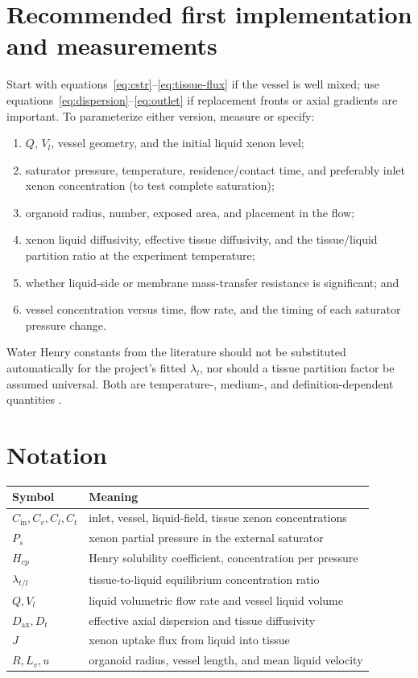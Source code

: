\documentclass[11pt]{article}
\begin{document}
\section{Recommended first implementation and measurements}

Start with equations~\eqref{eq:cstr}--\eqref{eq:tissue-flux} if the vessel is
well mixed; use equations~\eqref{eq:dispersion}--\eqref{eq:outlet} if
replacement fronts or axial gradients are important. To parameterize either
version, measure or specify:
\begin{enumerate}
  \item \(Q\), \(V_l\), vessel geometry, and the initial liquid xenon level;
  \item saturator pressure, temperature, residence/contact time, and
        preferably inlet xenon concentration (to test complete saturation);
  \item organoid radius, number, exposed area, and placement in the flow;
  \item xenon liquid diffusivity, effective tissue diffusivity, and the
        tissue/liquid partition ratio at the experiment temperature;
  \item whether liquid-side or membrane mass-transfer resistance is
        significant; and
  \item vessel concentration versus time, flow rate, and the timing of each
        saturator pressure change.
\end{enumerate}
Water Henry constants from the literature should not be substituted
automatically for the project's fitted \(\lambda_l\), nor should a tissue
partition factor be assumed universal. Both are temperature-, medium-, and
definition-dependent quantities \cite{Sander2023,Ercan1979}.

\section*{Notation}
\begin{center}
\begin{tabular}{@{}ll@{}}
\toprule
Symbol & Meaning\\
\midrule
\(C_{\mathrm{in}},C_v,C_l,C_t\) & inlet, vessel, liquid-field, tissue xenon concentrations\\
\(P_s\) & xenon partial pressure in the external saturator\\
\(H_{cp}\) & Henry solubility coefficient, concentration per pressure\\
\(\lambda_{t/l}\) & tissue-to-liquid equilibrium concentration ratio\\
\(Q,V_l\) & liquid volumetric flow rate and vessel liquid volume\\
\(D_{\mathrm{ax}},D_t\) & effective axial dispersion and tissue diffusivity\\
\(J\) & xenon uptake flux from liquid into tissue\\
\(R,L_v,u\) & organoid radius, vessel length, and mean liquid velocity\\
\bottomrule
\end{tabular}
\end{center}
\end{document}
